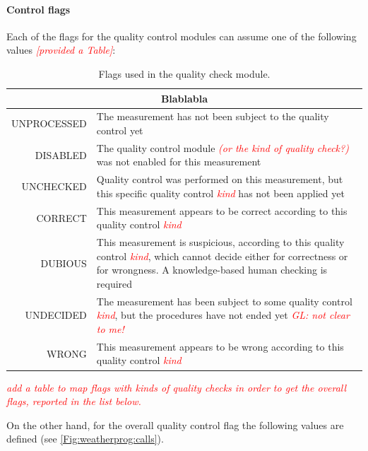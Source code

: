 \documentclass[authoryear,preprint,review,12pt]{elsarticle}
\newcommand{\note}[1]{\emph{\textcolor{red}{#1}}}
\begin{document}
\paragraph{Control flags}\label{controlFlags} %
Each of the flags for the quality control modules can assume one of the following values \note{[provided a Table]}:
\begin{table}[]
    \begin{scriptsize}
    \centering
    \begin{tabular}{r|p{10cm}}
    \multicolumn{2}{c}{Blablabla} \\
    \hline
	UNPROCESSED & The measurement has not been subject to the quality control yet\\
	DISABLED & The quality control module \note{(or the kind of quality check?)} was not enabled for this measurement\\
	UNCHECKED & Quality control was performed on this measurement, but this specific quality control \note{kind} has not been applied yet\\
	CORRECT & This measurement appears to be correct according to this quality control \note{kind} \\
	DUBIOUS & This measurement is suspicious, according to this quality control \note{kind}, which cannot decide either for correctness or for wrongness. A knowledge-based human checking is required \\
	UNDECIDED & The measurement has been subject to some quality control \note{kind}, but the procedures have not ended yet \note{GL: not clear to me!}\\
	WRONG & This measurement appears to be wrong according to this quality control \note{kind} \\
    \end{tabular}
    \caption{Flags used in the quality check module.}
    \label{tab:flagsSummary}
    \end{scriptsize}
\end{table}

\note{add a table to map flags with kinds of quality checks in order to get the overall flags, reported in the list below.}

On the other hand, for the overall quality control flag the following values are defined (see \cref{Fig:weatherprog:calls}).
\end{document}
